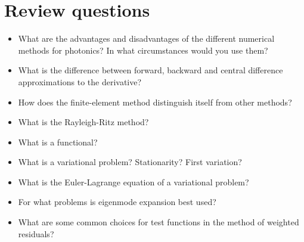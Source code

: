 \section*{Review questions}

\begin{itemize}
\item What are the advantages and disadvantages of the different numerical methods for photonics? In what circumstances would you use them?
\item What is the difference between forward, backward and central difference approximations to the derivative?
\item How does the finite-element method distinguish itself from other methods?
\item What is the Rayleigh-Ritz method?
\item What is a functional?
\item What is a variational problem? Stationarity? First variation?
\item What is the Euler-Lagrange equation of a variational problem?
\item For what problems is eigenmode expansion best used?
\item What are some common choices for test functions in the method of weighted residuals?  
\end{itemize}

